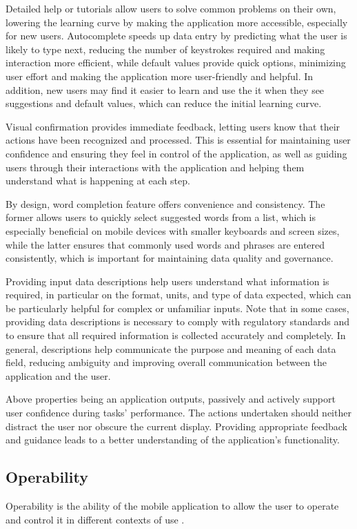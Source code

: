 \documentclass[preprint,12pt]{elsarticle}
\begin{document}
Detailed help or tutorials allow users to solve common problems on their own, lowering the learning curve by making the application more accessible, especially for new users. Autocomplete speeds up data entry by predicting what the user is likely to type next, reducing the number of keystrokes required and making interaction more efficient, while default values provide quick options, minimizing user effort and making the application more user-friendly and helpful. In addition, new users may find it easier to learn and use the it when they see suggestions and default values, which can reduce the initial learning curve.

Visual confirmation provides immediate feedback, letting users know that their actions have been recognized and processed. This is essential for maintaining user confidence and ensuring they feel in control of the application, as well as guiding users through their interactions with the application and helping them understand what is happening at each step.

By design, word completion feature offers convenience and consistency. The former allows users to quickly select suggested words from a list, which is especially beneficial on mobile devices with smaller keyboards and screen sizes, while the latter ensures that commonly used words and phrases are entered consistently, which is important for maintaining data quality and governance.

Providing input data descriptions help users understand what information is required, in particular on the format, units, and type of data expected, which can be particularly helpful for complex or unfamiliar inputs. Note that in some cases, providing data descriptions is necessary to comply with regulatory standards and to ensure that all required information is collected accurately and completely. In general, descriptions help communicate the purpose and meaning of each data field, reducing ambiguity and improving overall communication between the application and the user.

Above properties being an application outputs, passively and actively support user confidence during tasks’ performance. The actions undertaken should neither distract the user nor obscure the current display. Providing appropriate feedback and guidance leads to a better understanding of the application's functionality.

\subsection{Operability} %
Operability is the ability of the mobile application to allow the user to operate and control it in different contexts of use \cite{weichbroth2024usability}. 
\end{document}
